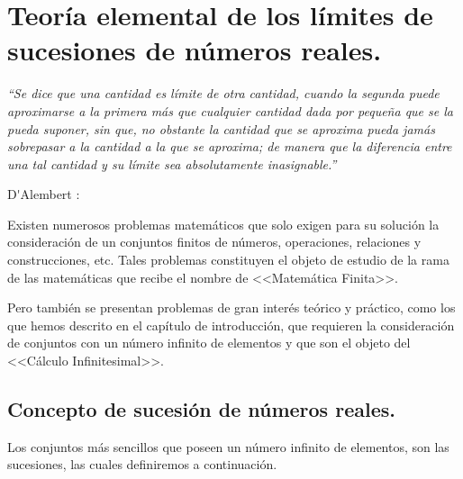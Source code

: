 \documentclass[oneside,english,spanish,2m,twoside,svgnames,x11names,HTML,twoside,12pt]{libro-matua}\usepackage[]{graphicx}\usepackage[]{color}
\begin{document}
\chapter{Teor\'ia elemental de los l\'imites de sucesiones de n\'umeros
reales. }
\begin{flushright}
\vspace*{-2cm}
\begin{minipage}[c]{0.4\columnwidth}%
\textit{\footnotesize{}“Se dice que una cantidad es límite de otra
cantidad, cuando la segunda puede aproximarse a la primera más que
cualquier cantidad dada por pequeña que se la pueda suponer, sin que,
no obstante la cantidad que se aproxima pueda jamás sobrepasar a la
cantidad a la que se aproxima; de manera que la diferencia entre una
tal cantidad y su límite sea absolutamente inasignable.”} %
\end{minipage}
\par\end{flushright}

\begin{flushright}
D\'{ }Alembert : 
\par\end{flushright}

\vspace*{-1mm}

\PartialToc

\hypersetup{linkcolor=ptctitle}

\vspace*{10pt}

\intro

Existen numerosos problemas matemáticos que solo exigen para su solución
la consideración de un conjuntos finitos de números, operaciones,
relaciones y construcciones, etc. Tales problemas constituyen el objeto
de estudio de la rama de las matemáticas que recibe el nombre de <<Matemática
Finita>>.

Pero también se presentan problemas de gran interés teórico y práctico,
como los que hemos descrito en el capítulo de introducción, que requieren
la consideración de conjuntos con un número infinito de elementos
y que son el objeto del <<Cálculo Infinitesimal>>.

\section{Concepto de sucesión de números reales. }

Los conjuntos más sencillos que poseen un número infinito de elementos,
son las sucesiones, las cuales definiremos a continuación.
\end{document}
